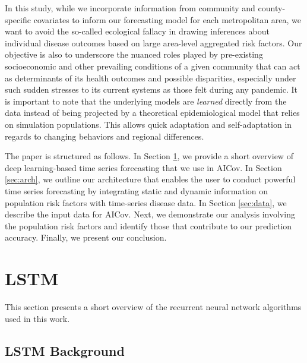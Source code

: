 \documentclass[12pt]{article}
\theoremstyle{definition}
\renewcommand{\_}{%
    \textunderscore\hspace{0pt}%
}
\begin{document}
In this study, while we incorporate information from community and county-specific covariates to inform our forecasting model for each metropolitan area, we want to avoid the so-called ecological fallacy in drawing inferences about individual disease outcomes based on large area-level aggregated risk factors. Our objective is also to underscore the nuanced roles played by pre-existing socioeconomic and other prevailing conditions of a given community that can act as determinants of its health outcomes and possible disparities,  especially under such sudden stresses to its current systems as those felt during any pandemic.
It is important to note that the underlying models are {\em learned} directly from the data instead of being projected by a theoretical epidemiological model that relies on simulation populations. This allows quick adaptation and self-adaptation in regards to changing behaviors and regional differences. 

The paper is structured as follows. In Section \ref{sec:lstm-theory}, we provide a short overview of deep learning-based time series forecasting that we use in AICov. In Section \ref{sec:arch}, we outline our architecture that enables the user to conduct powerful time series forecasting by integrating static and dynamic information on population risk factors with time-series disease data. In Section \ref{sec:data}, we describe the input data for AICov. Next, we demonstrate our analysis involving the population risk factors and identify those that contribute to our prediction accuracy. Finally, we present our conclusion.



\section{LSTM}
\label{sec:lstm-theory}

This section presents a short overview of the recurrent neural network algorithms used in this work.

\subsection{LSTM Background}
\label{sec:lstm-background}
\end{document}
